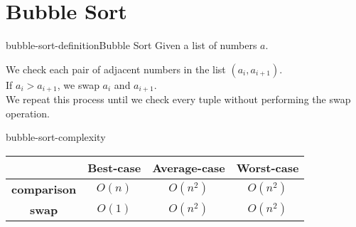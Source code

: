 \documentclass[preview]{standalone}
\begin{document}
\genpage

\section{Bubble Sort}

\begin{snippetdefinition}{bubble-sort-definition}{Bubble Sort}
    Given a list of numbers \(a\).

    We check each pair of adjacent numbers in the list \((a_i,a_{i+1})\).\\
    If \(a_i>a_{i+1}\), we swap \(a_i\) and \(a_{i+1}\).\\
    We repeat this process until we check every tuple without performing the swap operation.
\end{snippetdefinition}

\begin{snippet}{bubble-sort-complexity}
    \def\arraystretch{1.5}
    \begin{center}
        \begin{tabular}{ |c|c|c|c| }
            \hline
            & \textbf{Best-case} & \textbf{Average-case} &\textbf{Worst-case} \\
            \hline
            \textbf{comparison} & \(O(n)\) & \(O(n^2)\) & \(O(n^2)\) \\ 
            \hline
            \textbf{swap} & \(O(1)\) & \(O(n^2)\) & \(O(n^2)\) \\ 
            \hline
        \end{tabular}
    \end{center}
    \vspace{0.5cm}
\end{snippet}

\end{document}
